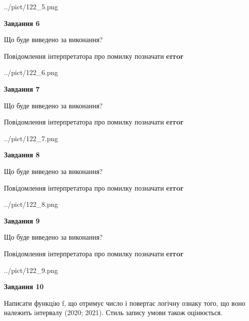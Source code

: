 \documentclass[12pt, ukrainian]{article}
\begin{document}
{\begin {large}
\begin{center}
	{../pict/122_5.png}
\end{center}
\newpage

{\begin {center}\textbf{Завдання 6}\end {center}}\par
Що буде виведено за виконання? \par
Повідомлення інтерпретатора про помилку позначати \textbf{error}

\begin{center}
	{../pict/122_6.png}
\end{center}
\newpage

{\begin {center}\textbf{Завдання 7}\end {center}}\par
Що буде виведено за виконання? \par
Повідомлення інтерпретатора про помилку позначати \textbf{error}

\begin{center}
	{../pict/122_7.png}
\end{center}
\newpage

{\begin {center}\textbf{Завдання 8}\end {center}}\par
Що буде виведено за виконання? \par
Повідомлення інтерпретатора про помилку позначати \textbf{error}

\begin{center}
	{../pict/122_8.png}
\end{center}
\newpage

{\begin {center}\textbf{Завдання 9}\end {center}}\par
Що буде виведено за виконання? \par
Повідомлення інтерпретатора про помилку позначати \textbf{error}

\begin{center}
	{../pict/122_9.png}
\end{center}
\newpage

{\begin {center}\textbf{Завдання 10}\end {center}}\par

Написати функцiю f, що отримує число і повертає логічну ознаку того, що воно належить iнтервалу (2020; 2021). Стиль запису умови також оцінюється.\par
\newpage

\end {large}}
\end{document}
